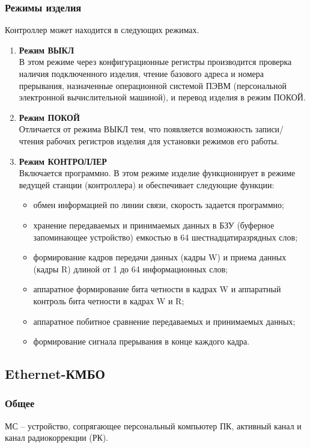 	\subsubsection{Режимы изделия}
	Контроллер может находится в следующих режимах.
	\begin{enumerate}
		\item \textbf{Режим ВЫКЛ}\\
		В этом режиме через конфигурационные регистры производится проверка наличия подключенного изделия, чтение базового адреса и номера прерывания, назначенные операционной системой ПЭВМ (персональной электронной вычислительной машиной), и перевод изделия в режим ПОКОЙ.
		
		\item \textbf{Режим ПОКОЙ} \\
		Отличается от режима ВЫКЛ тем, что появляется возможность записи/чтения рабочих регистров изделия для установки режимов его работы. 
		
		\item \textbf{Режим КОНТРОЛЛЕР} \\
		Включается программно. В этом режиме изделие функционирует в режиме ведущей станции (контроллера) и обеспечивает следующие функции:
		\begin{itemize}
			\item обмен информацией по линии связи, скорость задается программно;
			\item хранение передаваемых и принимаемых данных в БЗУ (буферное запоминающее устройство) емкостью в 64 шестнадцатиразрядных слов;
			\item формирование кадров передачи данных (кадры W) и приема данных (кадры R) длиной от 1 до 64 информационных слов;
			\item аппаратное формирование бита четности в кадрах W и аппаратный контроль бита четности в кадрах W и R;
			\item аппаратное побитное сравнение передаваемых и принимаемых данных;
			\item формирование сигнала прерывания в конце каждого кадра.
		\end{itemize}
	\end{enumerate}

	\subsection{Ethernet-КМБО}
	\subsubsection{Общее}
	МС – устройство, сопрягающее персональный компьютер ПК, активный канал и канал радиокоррекции (РК). \\
	
